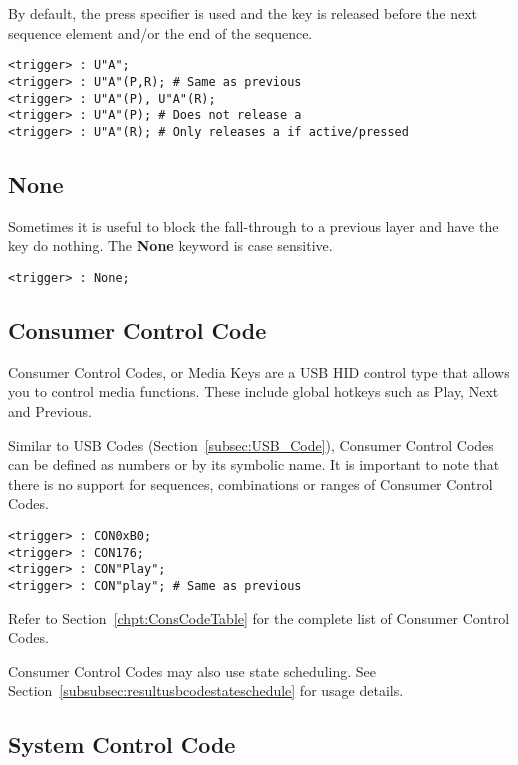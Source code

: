 \documentclass{kiibohd-template}
\begin{document}
By default, the press specifier is used and the key is released before the next sequence element and/or the end of the sequence.

\begin{lstlisting}
<trigger> : U"A";
<trigger> : U"A"(P,R); # Same as previous
<trigger> : U"A"(P), U"A"(R);
<trigger> : U"A"(P); # Does not release a
<trigger> : U"A"(R); # Only releases a if active/pressed
\end{lstlisting}


\subsection{None}

Sometimes it is useful to block the fall-through to a previous layer and have the key do nothing.
The \textbf{None} keyword is case sensitive.

\begin{lstlisting}
<trigger> : None;
\end{lstlisting}


\subsection{Consumer Control Code}

Consumer Control Codes, or Media Keys are a USB HID control type that allows you to control media functions.
These include global hotkeys such as Play, Next and Previous.

Similar to USB Codes (Section~\ref{subsec:USB_Code}), Consumer Control Codes can be defined as numbers or by its symbolic name.
It is important to note that there is no support for sequences, combinations or ranges of Consumer Control Codes.

\begin{lstlisting}
<trigger> : CON0xB0;
<trigger> : CON176;
<trigger> : CON"Play";
<trigger> : CON"play"; # Same as previous
\end{lstlisting}

Refer to Section~\ref{chpt:ConsCodeTable} for the complete list of Consumer Control Codes.

Consumer Control Codes may also use state scheduling. See Section~\ref{subsubsec:resultusbcodestateschedule} for usage details.


\subsection{System Control Code}
\end{document}
